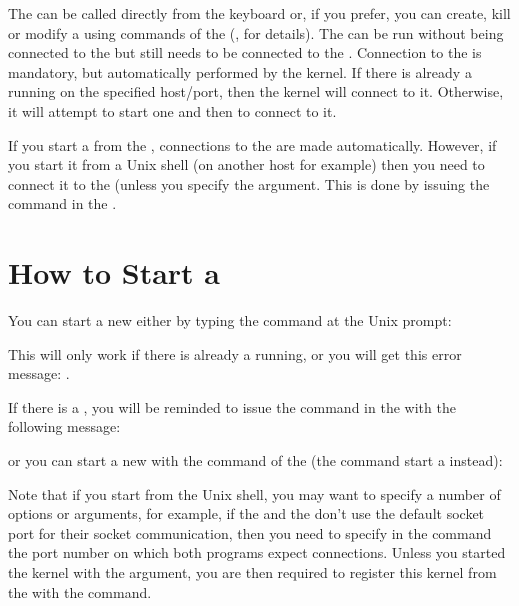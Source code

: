 The \COPRS{} can be called directly from the keyboard or, if you prefer, you can
create, kill or modify a \CPK{} using commands of the \OPRSS{}
(, for details). The \CPK{} can be run
without being connected to the \OPRSS{} but still needs to be connected to
the \MPA{}. Connection to the \MPA{}  is mandatory, but  automatically performed by
the kernel. If there is already a \MPA{} running on the specified host/port,
then  the kernel will connect to it. Otherwise, it will attempt to start one
and then to connect to it.

If you start a \CPK{} from the \OPRSS{}, connections to the \OPRSS{}
are made automatically. However, if you start it from a Unix shell (on another
host for example) then you need to connect it to the \OPRSS{} (unless you
specify the  argument. This is done by issuing the 
command in the \OPRSS{}.

\section{How to Start a \CPK{}}


You can start a new \CPK{} either by typing the command 
at the Unix prompt:


This will only work if there is already a \OPRSS{} running, or you will get
this error message:\* 
.

If there is a \OPRSS{}, you will be reminded to issue the 
command in the \OPRSS{} with the following message:\*

or you can start a new \CPK{} with the  command of the \OPRSS{}
(the  command start a \XPK{} instead):


Note that if you start \COPRS{} from the Unix shell, you may want to specify a
number of options or arguments, for example, if the \OPRSS{} and the
\MPA{} don't use the default socket port for their socket communication,
then you need to specify in the  command the port number on which
both programs expect connections. Unless you started the kernel with the
 argument, you are then required to register this kernel from the
\OPRSS{} with the  command.

